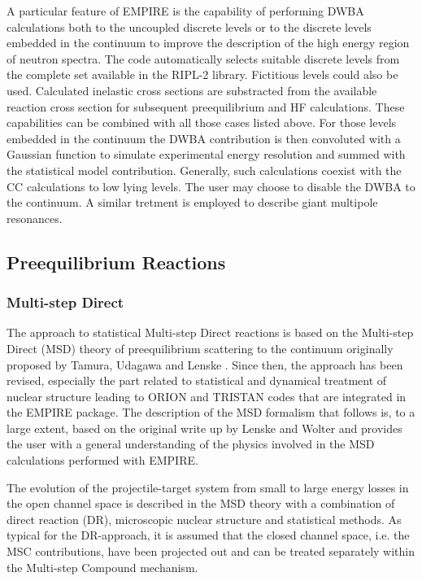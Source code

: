 A particular feature of EMPIRE is the capability of performing DWBA calculations
both to the uncoupled discrete levels or to the discrete levels embedded
in the continuum to improve the description of the high energy region of
neutron spectra. The code automatically selects suitable discrete levels
from the complete set available in the RIPL-2 library. Fictitious levels could also
be used. Calculated inelastic cross sections are substracted from the available
reaction cross section for subsequent preequilibrium and HF calculations.
These capabilities can be combined with all those cases listed above.
For those levels embedded in the continuum the DWBA contribution
is then convoluted with a Gaussian function to simulate experimental energy
resolution and summed with the statistical model contribution. Generally,
such calculations coexist with the CC calculations to low lying levels. The
user may choose to disable the DWBA to the continuum. A similar tretment is employed
to describe giant multipole resonances.

\subsection{Preequilibrium Reactions}


\subsubsection{Multi-step Direct\label{sec: MSD}}

The approach to statistical Multi-step Direct%
 reactions is based on the Multi-step Direct (MSD) theory of
preequilibrium scattering to the continuum originally proposed by Tamura,
Udagawa and Lenske \cite{TUL}. Since then, the approach has been revised,
especially the part related to statistical and dynamical treatment of
nuclear structure leading to ORION and TRISTAN codes that are integrated in
the EMPIRE package. The description of the MSD formalism that follows is, to
a large extent, based on the original write up by Lenske and Wolter and
provides the user with a general understanding of the physics involved in
the MSD calculations performed with EMPIRE.

The evolution of the projectile-target system from small to large energy
losses in the open channel space is described in the MSD theory with a
combination of direct reaction (DR), microscopic nuclear structure and
statistical methods. As typical for the DR-approach, it is assumed that the
closed channel space, i.e. the MSC%
 contributions, have been projected out and can be treated
separately within the Multi-step Compound%
 mechanism.

